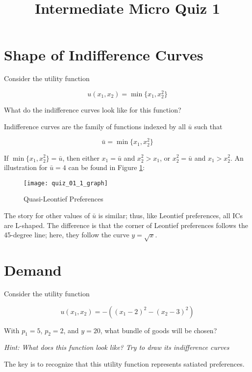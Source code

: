 \documentclass{article}
\begin{document}
\title{Intermediate Micro Quiz 1}

\maketitle

\section{Shape of Indifference Curves}

Consider the utility function

\[
u(x_1, x_2) = \min\{x_1, x_2^2\}
\]

What do the indifference curves look like for this function?

\color{red}
Indifference curves are the family of functions indexed by all $\bar{u}$ such that

\[
\bar{u} = \min\{x_1, x_2^2\}
\]

If $\min\{x_1, x_2^2\} = \bar{u}$, then either $x_1 = \bar{u}$ and $x_2^2 > x_1$, or $x_2^2 = \bar{u}$ and $x_1 > x_2^2$. An illustration for $\bar{u} = 4$ can be found in Figure \ref{leon}:

\begin{figure}[htbp]
\centering
\texttt{[image: quiz\_01\_1\_graph]}
\caption{Quasi-Leontief Preferences}
\label{leon}
\end{figure}

The story for other values of $\bar{u}$ is similar; thus, like Leontief preferences, all ICs are L-shaped. The difference is that the corner of Leontief preferences follows the 45-degree line; here, they follow the curve $y = \sqrt{x}$.

\color{black}

\section{Demand}

Consider the utility function

\[
u(x_1, x_2) = -\left((x_1 - 2)^2 - (x_2 - 3)^2\right)
\]

With $p_1 = 5$, $p_2 = 2$, and $y = 20$, what bundle of goods will be chosen?

\textit{Hint: What does this function look like? Try to draw its indifference curves}

\color{red}
The key is to recognize that this utility function represents satiated preferences.
\end{document}
